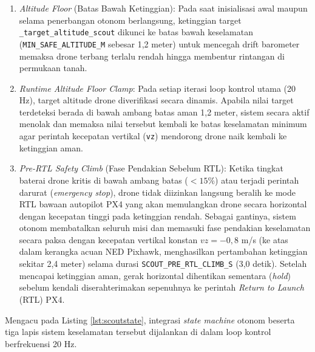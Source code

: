 \begin{enumerate}
	\item \textit{Altitude Floor} (Batas Bawah Ketinggian): Pada saat inisialisasi awal maupun selama penerbangan otonom berlangsung, ketinggian target \texttt{\_target\_altitude\_scout} dikunci ke batas bawah keselamatan (\texttt{MIN\_SAFE\_ALTITUDE\_M} sebesar 1,2 meter) untuk mencegah drift barometer memaksa drone terbang terlalu rendah hingga membentur rintangan di permukaan tanah.
	\item \textit{Runtime Altitude Floor Clamp}: Pada setiap iterasi loop kontrol utama (20 Hz), target altitude drone diverifikasi secara dinamis. Apabila nilai target terdeteksi berada di bawah ambang batas aman 1,2 meter, sistem secara aktif menolak dan memaksa nilai tersebut kembali ke batas keselamatan minimum agar perintah kecepatan vertikal (\texttt{vz}) mendorong drone naik kembali ke ketinggian aman.
	\item \textit{Pre-RTL Safety Climb} (Fase Pendakian Sebelum RTL): Ketika tingkat baterai drone kritis di bawah ambang batas ($< 15\%$) atau terjadi perintah darurat (\textit{emergency stop}), drone tidak diizinkan langsung beralih ke mode RTL bawaan autopilot PX4 yang akan memulangkan drone secara horizontal dengan kecepatan tinggi pada ketinggian rendah. Sebagai gantinya, sistem otonom membatalkan seluruh misi dan memasuki fase pendakian keselamatan secara paksa dengan kecepatan vertikal konstan $vz = -0,8$ m/s (ke atas dalam kerangka acuan NED Pixhawk, menghasilkan pertambahan ketinggian sekitar 2,4 meter) selama durasi \texttt{SCOUT\_PRE\_RTL\_CLIMB\_S} (3,0 detik). Setelah mencapai ketinggian aman, gerak horizontal dihentikan sementara (\textit{hold}) sebelum kendali diserahterimakan sepenuhnya ke perintah \textit{Return to Launch} (RTL) PX4.
\end{enumerate}

Mengacu pada Listing \ref{lst:scoutstate}, integrasi \textit{state machine} otonom beserta tiga lapis sistem keselamatan tersebut dijalankan di dalam loop kontrol berfrekuensi 20 Hz.

